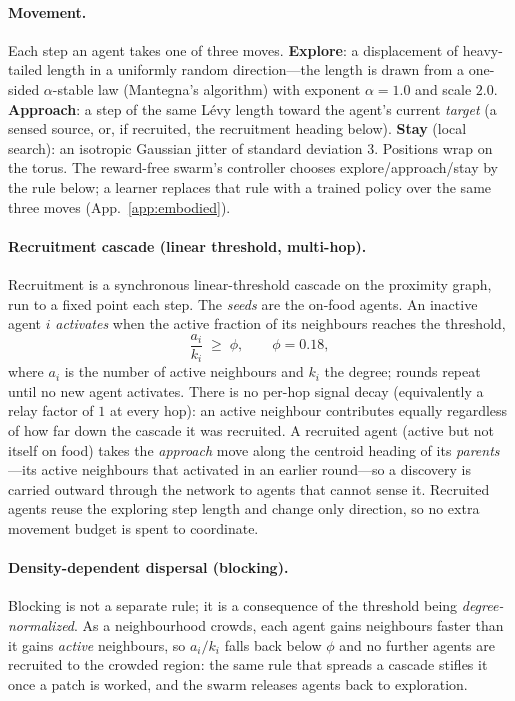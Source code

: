 \documentclass{article}
\begin{document}
\paragraph{Movement.} Each step an agent takes one of three moves. \textbf{Explore}: a displacement of
heavy-tailed length in a uniformly random direction---the length is drawn from a one-sided $\alpha$-stable law
(Mantegna's algorithm) with exponent $\alpha{=}1.0$ and scale $2.0$. \textbf{Approach}: a step of the same
Lévy length toward the agent's current \emph{target} (a sensed source, or, if recruited, the recruitment
heading below). \textbf{Stay} (local search): an isotropic Gaussian jitter of standard deviation $3$. Positions
wrap on the torus. The reward-free swarm's controller chooses explore/approach/stay by the rule below; a
learner replaces that rule with a trained policy over the same three moves (App.~\ref{app:embodied}).

\paragraph{Recruitment cascade (linear threshold, multi-hop).} Recruitment is a synchronous linear-threshold
cascade on the proximity graph, run to a fixed point each step. The \emph{seeds} are the on-food agents. An
inactive agent $i$ \emph{activates} when the active fraction of its neighbours reaches the threshold,
\[
  \frac{a_i}{k_i}\;\ge\;\phi,\qquad \phi=0.18,
\]
where $a_i$ is the number of active neighbours and $k_i$ the degree; rounds repeat until no new agent
activates. There is no per-hop signal decay (equivalently a relay factor of $1$ at every hop): an active
neighbour contributes equally regardless of how far down the cascade it was recruited. A recruited agent (active
but not itself on food) takes the \emph{approach} move along the centroid heading of its \emph{parents}---its
active neighbours that activated in an earlier round---so a discovery is carried outward through the network to
agents that cannot sense it. Recruited agents reuse the exploring step length and change only direction, so no
extra movement budget is spent to coordinate.

\paragraph{Density-dependent dispersal (blocking).} Blocking is not a separate rule; it is a consequence of the
threshold being \emph{degree-normalized}. As a neighbourhood crowds, each agent gains neighbours faster than it
gains \emph{active} neighbours, so $a_i/k_i$ falls back below $\phi$ and no further agents are recruited to
the crowded region: the same rule that spreads a cascade stifles it once a patch is worked, and the swarm
releases agents back to exploration.
\end{document}
